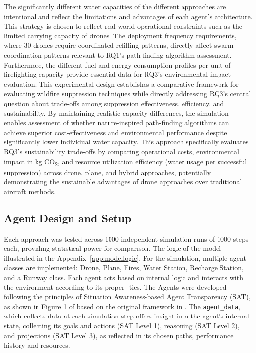 \documentclass[11pt, a4paper]{article}
\begin{document}
The significantly different water capacities of the different approaches are intentional and reflect the limitations and advantages of each agent's architecture. This strategy is chosen to reflect real-world operational constraints such as the limited carrying capacity of drones.
 The deployment frequency requirements, where 30 drones require coordinated refilling patterns, directly affect swarm coordination patterns relevant to RQ1's path-finding algorithm assessment. Furthermore, the different fuel and energy consumption profiles per unit of firefighting capacity provide essential data for RQ3's environmental impact evaluation.
 This experimental design establishes a comparative framework for evaluating wildfire suppression techniques while directly addressing RQ3's central question about trade-offs among suppression effectiveness, efficiency, and sustainability. By maintaining realistic capacity differences, the simulation enables assessment of whether nature-inspired path-finding algorithms can achieve superior cost-effectiveness and environmental performance despite significantly lower individual water capacity. This approach specifically evaluates RQ3's sustainability trade-offs by comparing operational costs, environmental impact in kg CO\textsubscript{2}, and resource utilization efficiency (water usage per successful suppression) across drone, plane, and hybrid approaches, potentially demonstrating the sustainable advantages of drone approaches over traditional aircraft methods.


\subsection{Agent Design and Setup}

Each approach was tested across 1000 independent simulation runs of 1000 steps each, providing statistical power for comparison. The logic of the model illustrated in the Appendix~\ref{app:modellogic}.
For the simulation, multiple agent classes are implemented: Drone, Plane, Fires, Water Station, Recharge Station, and a Runway class. Each agent acts based on internal logic and interacts with the environment according to its proper-
ties. The Agents were developed following the principles of Situation Awareness-based
Agent Transparency (SAT), as shown in Figure 1 of \citep{chenSituationAwarenessbasedAgent2018} based on the
original framework in \citet*{SAT_first}. The \texttt{agent\_data}, which collects data at each simulation step offers insight into the agent’s internal state, collecting its goals and actions (SAT Level 1), reasoning (SAT Level 2), and projections (SAT Level 3), as reflected in its chosen paths, performance history and resources.
\end{document}
